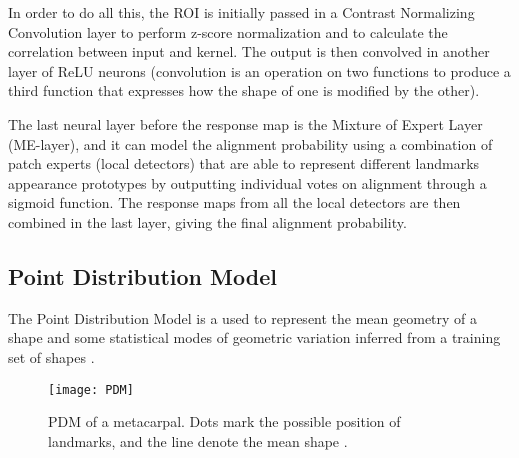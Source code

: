 In order to do all this, the ROI is initially passed in a Contrast Normalizing Convolution layer to perform z-score normalization and to calculate the correlation between input and kernel. The output is then convolved in another layer of ReLU neurons (convolution is an operation on two functions to produce a third function that expresses how the shape of one is modified by the other).

The last neural layer before the response map is the Mixture of Expert Layer (ME-layer), and it can model the alignment probability using a combination of patch experts (local detectors) that are able to represent different landmarks appearance prototypes by outputting individual votes on alignment through a sigmoid function. The response maps from all the local detectors are then combined in the last layer, giving the final alignment probability.

\subsection{Point Distribution Model}
The Point Distribution Model is a used to represent the mean geometry of a shape and some statistical modes of geometric variation inferred from a training set of shapes \cite{wiki:PDM}. 

\begin{figure}[H]
	\centering
	\texttt{[image: PDM]}
	\caption{PDM of a metacarpal. Dots mark the possible position of landmarks, and the line denote the mean shape \cite{PDM}.}
	\label{fig:PDM}
\end{figure}

